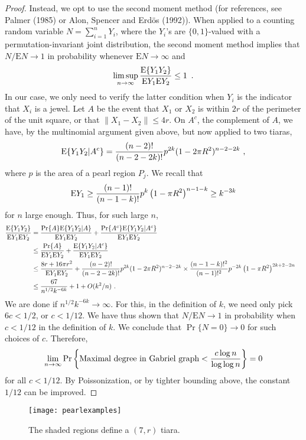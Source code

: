 \documentclass[lotsofwhite,charterfonts]{patmorin}
\newcommand{\PROB}{\Pr}
\newcommand{\EXP}{\mathrm{E}}
\begin{document}
\begin{proof}
Instead, we opt to use the second moment
method (for references, see Palmer (1985) or
Alon, Spencer and Erd\"os (1992)). When
applied to a counting random variable $N = \sum_{i=1}^n Y_i$,
where the $Y_i$'s are $\{ 0,1 \}$-valued with
a permutation-invariant joint distribution,
the second moment method implies that
$N/\EXP N \to 1$ in probability whenever
$\EXP N \to \infty$ and
$$
\limsup_{n\to\infty} {\EXP \{ Y_1 Y_2 \} \over \EXP Y_1 \EXP Y_2 } \le 1 \enspace .
$$
In our case, we only need to verify the latter
condition when $Y_i$ is the indicator that
$X_i$ is a jewel.
Let $A$ be the event that $X_1$ or $X_2$ is within
$2r$ of the perimeter of the unit square, or that
$\| X_1 - X_2 \| \le 4r$.
On $A^c$, the complement of $A$, we have, by
the multinomial argument given above, but now
applied to two tiaras,
$$
\EXP \{ Y_1 Y_2 | A^c \}
= { (n-2)! \over (n-2-2k)! } p^{2k} (1-2\pi R^2)^{n-2-2k}~,
$$
where $p$ is the area of a pearl region $P_j$.
We recall that
$$
\EXP Y_1 \ge
{(n-1)! \over (n-1-k)!} p^k \left( 1 - \pi R^2 \right)^{n-1-k}
\ge k^{-3k}
$$
for $n$ large enough.
Thus, for such large $n$,
$$
\begin{aligned}
{\EXP \{ Y_1 Y_2 \} \over \EXP Y_1 \EXP Y_2 } 
&=
{\PROB\{A\}\EXP \{ Y_1 Y_2 |A \} \over \EXP Y_1 \EXP Y_2 }
+ {\PROB\{A^c\}\EXP \{ Y_1 Y_2 | {A^c} \} \over \EXP Y_1 \EXP Y_2 } \cr
&\le
{\PROB \{ A \} \over \EXP Y_1 \EXP Y_2 }
+ {\EXP \{ Y_1 Y_2 | A^c \} \over \EXP Y_1 \EXP Y_2 } \cr
&\le
{8r + 16 \pi r^2 \over \EXP Y_1 \EXP Y_2 }
+ { (n-2)! \over (n-2-2k)! } p^{2k} (1-2\pi R^2)^{n-2-2k}\times
{(n-1-k)!^2 \over (n-1)!^2} p^{-2k} \left( 1 - \pi R^2 \right)^{2k+2-2n} \cr
&\le
{67 \over n^{1/2} k^{-6k}} + 1 + O(k^2/n) ~. \cr
\end{aligned}
$$
We are done if $n^{1/2} k^{-6k} \to \infty$. For this,
in the definition of $k$, we need only pick
$6c < 1/2$, or $c < 1/12$.
We have thus shown that $N/\EXP N \to 1$ in probability
when $c < 1/12$ in the definition of $k$.
We conclude that
$\PROB \{ N = 0 \}  \to 0$ for such choices of $c$.
Therefore,
$$
\lim_{n\to\infty}
\PROB \left\{ \hbox{\rm Maximal degree in Gabriel graph}
	   < {c \log n \over \log \log n } \right\}
	   = 0
$$
for all $c < 1/12$.
By Poissonization, or by
tighter bounding above, the constant $1/12$ can be improved.
\end{proof}


\begin{figure}
\begin{center}{\texttt{[image: pearlexamples]}}\end{center}
\caption{The shaded regions define a $(7,r)$ tiara.}
\end{figure}
\end{document}

